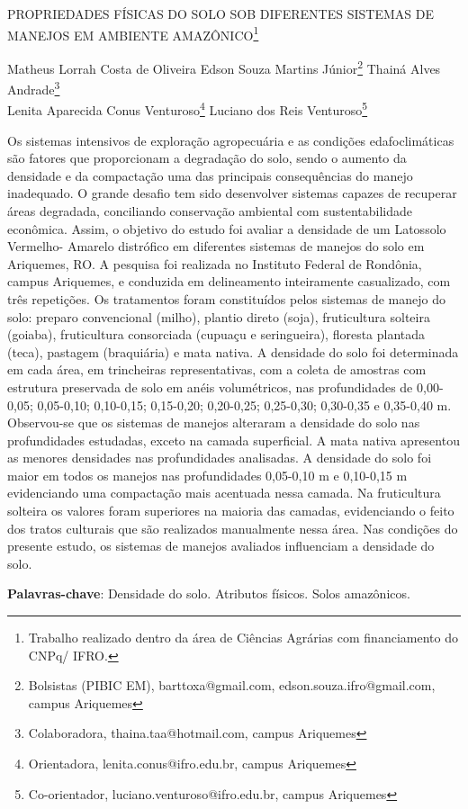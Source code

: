 \documentclass[article,12pt,onesidea,4paper,english,brazil]{abntex2}
\begin{document}
	
	
	\frenchspacing 
	
	\begin{center}
		\LARGE PROPRIEDADES FÍSICAS DO SOLO SOB DIFERENTES SISTEMAS DE MANEJOS EM AMBIENTE AMAZÔNICO\footnote{Trabalho realizado dentro da área de Ciências Agrárias com financiamento do CNPq/ IFRO.}
		
		\normalsize
		Matheus Lorrah Costa de Oliveira 
		Edson Souza Martins Júnior\footnote{Bolsistas (PIBIC EM), barttoxa@gmail.com, edson.souza.ifro@gmail.com, campus Ariquemes} 
		Thainá Alves Andrade\footnote{Colaboradora, thaina.taa@hotmail.com, campus Ariquemes} \\
		Lenita Aparecida Conus Venturoso\footnote{Orientadora, lenita.conus@ifro.edu.br, campus Ariquemes}
		Luciano dos Reis Venturoso\footnote{Co-orientador, luciano.venturoso@ifro.edu.br, campus Ariquemes} 
	\end{center}
	
	\noindent Os sistemas intensivos de exploração agropecuária e as condições edafoclimáticas
	são fatores que proporcionam a degradação do solo, sendo o aumento da densidade
	e da compactação uma das principais consequências do manejo inadequado. O
	grande desafio tem sido desenvolver sistemas capazes de recuperar áreas
	degradada, conciliando conservação ambiental com sustentabilidade econômica.
		Assim, o objetivo do estudo foi avaliar a densidade de um Latossolo Vermelho-
	Amarelo distrófico em diferentes sistemas de manejos do solo em Ariquemes, RO. A
	pesquisa foi realizada no Instituto Federal de Rondônia, campus Ariquemes, e
	conduzida em delineamento inteiramente casualizado, com três repetições. Os
	tratamentos foram constituídos pelos sistemas de manejo do solo: preparo
	convencional (milho), plantio direto (soja), fruticultura solteira (goiaba), fruticultura
	consorciada (cupuaçu e seringueira), floresta plantada (teca), pastagem (braquiária)
	e mata nativa. A densidade do solo foi determinada em cada área, em trincheiras
	representativas, com a coleta de amostras com estrutura preservada de solo em
	anéis volumétricos, nas profundidades de 0,00-0,05; 0,05-0,10; 0,10-0,15; 0,15-0,20;
	0,20-0,25; 0,25-0,30; 0,30-0,35 e 0,35-0,40 m. Observou-se que os sistemas de
	manejos alteraram a densidade do solo nas profundidades estudadas, exceto na
	camada superficial. A mata nativa apresentou as menores densidades nas
	profundidades analisadas. A densidade do solo foi maior em todos os manejos nas
	profundidades 0,05-0,10 m e 0,10-0,15 m evidenciando uma compactação mais
	acentuada nessa camada. Na fruticultura solteira os valores foram superiores na
	maioria das camadas, evidenciando o feito dos tratos culturais que são realizados
	manualmente nessa área. Nas condições do presente estudo, os sistemas de
	manejos avaliados influenciam a densidade do solo.
	
	\vspace{\onelineskip}
	
	\noindent
	\textbf{Palavras-chave}: Densidade do solo. Atributos físicos. Solos amazônicos.
	
\end{document}
